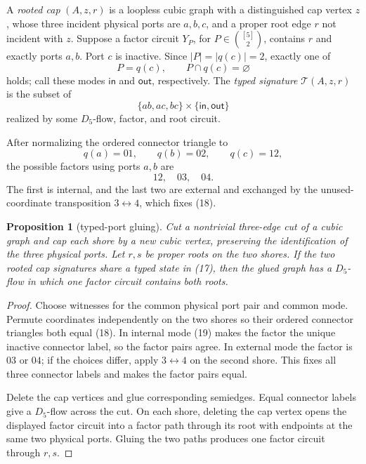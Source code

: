 \documentclass[11pt]{article}
\newtheorem{proposition}[theorem]{Proposition}
\theoremstyle{definition}
\theoremstyle{remark}
\begin{document}
A \emph{rooted cap} \((A,z,r)\) is a loopless cubic graph with a
distinguished cap vertex \(z\), whose three incident physical ports are
\(a,b,c\), and a proper root edge \(r\) not incident with \(z\).  Suppose a
factor circuit \(Y_P\), for \(P\in\binom{[5]}2\), contains \(r\) and
exactly ports \(a,b\).  Port \(c\) is inactive.  Since \(|P|=|q(c)|=2\),
exactly one of
\[
               P=q(c),\qquad P\cap q(c)=\varnothing           \tag{16}
\]
holds; call these modes \(\mathsf{in}\) and \(\mathsf{out}\), respectively.
The \emph{typed signature} \(\mathcal T(A,z,r)\) is the subset of
\[
       \{ab,ac,bc\}\times\{\mathsf{in},\mathsf{out}\}        \tag{17}
\]
realized by some \(D_5\)-flow, factor, and root circuit.

After normalizing the ordered connector triangle to
\[
                  q(a)=01,\qquad q(b)=02,\qquad q(c)=12,      \tag{18}
\]
the possible factors using ports \(a,b\) are
\[
                              12,\quad03,\quad04.              \tag{19}
\]
The first is internal, and the last two are external and exchanged by the
unused-coordinate transposition \(3\leftrightarrow4\), which fixes (18).

\begin{proposition}[typed-port gluing]\label{prop:typed-port-gluing}
Cut a nontrivial three-edge cut of a cubic graph and cap each shore by a
new cubic vertex, preserving the identification of the three physical
ports.  Let \(r,s\) be proper roots on the two shores.  If the two rooted
cap signatures share a typed state in \emph{(17)}, then the glued graph has
a \(D_5\)-flow in which one factor circuit contains both roots.
\end{proposition}

\begin{proof}
Choose witnesses for the common physical port pair and common mode.
Permute coordinates independently on the two shores so their ordered
connector triangles both equal (18).  In internal mode (19) makes the
factor the unique inactive connector label, so the factor pairs agree.
In external mode the factor is \(03\) or \(04\); if the choices differ,
apply \(3\leftrightarrow4\) on the second shore.  This fixes all three
connector labels and makes the factor pairs equal.

Delete the cap vertices and glue corresponding semiedges.  Equal connector
labels give a \(D_5\)-flow across the cut.  On each shore, deleting the cap
vertex opens the displayed factor circuit into a factor path through its
root with endpoints at the same two physical ports.  Gluing the two paths
produces one factor circuit through \(r,s\).
\end{proof}
\end{document}

